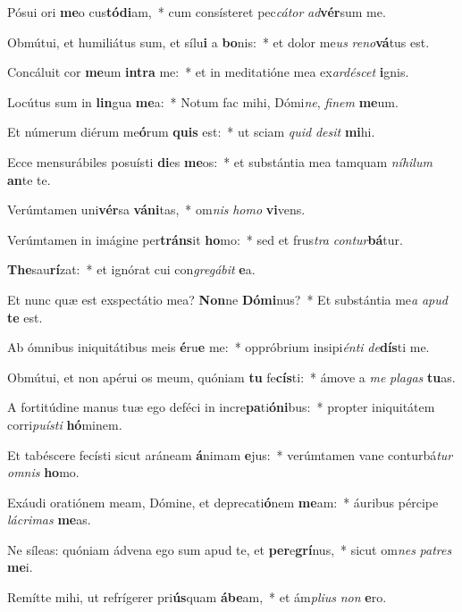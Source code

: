 \item Pósui ori \textbf{me}o cus\textbf{tó}\textbf{di}am,~* cum consísteret pec\textit{cá}\textit{tor} \textit{ad}\textbf{vér}sum me.
\item Obmútui, et humiliátus sum, et sílu\textbf{i} a \textbf{bo}nis:~* et dolor me\textit{us} \textit{re}\textit{no}\textbf{vá}tus est.
\item Concáluit cor \textbf{me}um \textbf{in}\textbf{tra} me:~* et in meditatióne mea ex\textit{ar}\textit{dé}\textit{scet} \textbf{i}gnis.
\item Locútus sum in \textbf{lin}gua \textbf{me}a:~* Notum fac mihi, Dómi\textit{ne}, \textit{fi}\textit{nem} \textbf{me}um.
\item Et númerum diérum me\textbf{ó}rum \textbf{quis} est:~* ut sciam \textit{quid} \textit{de}\textit{sit} \textbf{mi}hi.
\item Ecce mensurábiles posuísti \textbf{di}es \textbf{me}os:~* et substántia mea tamquam \textit{ní}\textit{hi}\textit{lum} \textbf{an}te te.
\item Verúmtamen uni\textbf{vér}sa \textbf{vá}\textbf{ni}tas,~* om\textit{nis} \textit{ho}\textit{mo} \textbf{vi}vens.
\item Verúmtamen in imágine per\textbf{tráns}it \textbf{ho}mo:~* sed et frus\textit{tra} \textit{con}\textit{tur}\textbf{bá}tur.
\item \textbf{The}sau\textbf{rí}zat:~* et ignórat cui con\textit{gre}\textit{gá}\textit{bit} \textbf{e}a.
\item Et nunc quæ est exspectátio mea? \textbf{Non}ne \textbf{Dó}\textbf{mi}nus?~* Et substántia me\textit{a} \textit{a}\textit{pud} \textbf{te} est.
\item Ab ómnibus iniquitátibus meis \textbf{é}ru\textbf{e} me:~* oppróbrium insipi\textit{én}\textit{ti} \textit{de}\textbf{dís}ti me.
\item Obmútui, et non apérui os meum, quóniam \textbf{tu} fe\textbf{cís}ti:~* ámove a \textit{me} \textit{pla}\textit{gas} \textbf{tu}as.
\item A fortitúdine manus tuæ ego deféci in incre\textbf{pa}ti\textbf{ó}\textbf{ni}bus:~* propter iniquitátem corri\textit{pu}\textit{ís}\textit{ti} \textbf{hó}minem.
\item Et tabéscere fecísti sicut aráneam \textbf{á}nimam \textbf{e}jus:~* verúmtamen vane conturbá\textit{tur} \textit{om}\textit{nis} \textbf{ho}mo.
\item Exáudi oratiónem meam, Dómine, et deprecati\textbf{ó}nem \textbf{me}am:~* áuribus pércipe \textit{lá}\textit{cri}\textit{mas} \textbf{me}as.
\item Ne síleas: quóniam ádvena ego sum apud te, et \textbf{per}e\textbf{grí}nus,~* sicut om\textit{nes} \textit{pa}\textit{tres} \textbf{me}i.
\item Remítte mihi, ut refrígerer pri\textbf{ús}quam \textbf{á}\textbf{be}am,~* et ám\textit{pli}\textit{us} \textit{non} \textbf{e}ro.
